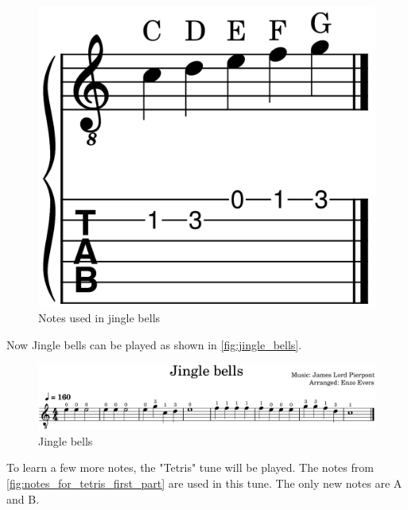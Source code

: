 \begin{figure}[h]
	\centering
	\includegraphics[height=0.12\textheight]{../../MuseScore/Guitar/NotesInJingleBells.png}
	\caption{Notes used in jingle bells}
	\label{fig:notes_in_jingle_bells}
\end{figure}

Now Jingle bells can be played as shown in \autoref{fig:jingle_bells}.

\begin{figure}[h]
	\centering
	\includegraphics[width=\textwidth]{../../MuseScore/Guitar/GuitarJingleBells.png}
	\caption{Jingle bells}
	\label{fig:jingle_bells}
\end{figure}

\newpage

To learn a few more notes, the "Tetris" tune will be played. The notes from \autoref{fig:notes_for_tetris_first_part} are used in this tune. The only new notes are A and B.

